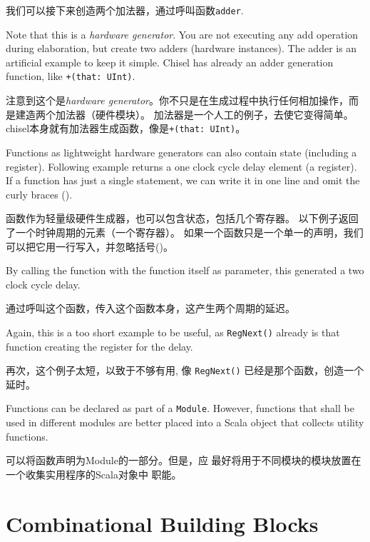 \documentclass[%
    10pt,
    headinclude, footexclude,
    openright, %
    notitlepage,
    cleardoubleempty,
    headsepline,
    pointlessnumbers,
    bibtotoc, idxtotoc,
    ]{scrbook}
\newcommand{\code}[1]{{\small{\texttt{#1}}}}
\begin{document}
\noindent 我们可以接下来创造两个加法器，通过呼叫函数\code{adder}.


\noindent Note that this is a \emph{hardware generator}. You are not executing any add operation
during elaboration, but create two adders (hardware instances). The adder is an artificial example
to keep it simple. Chisel has already an adder generation function, like \code{+(that: UInt)}.

\noindent 注意到这个是\emph{hardware generator}。你不只是在生成过程中执行任何相加操作，而是建造两个加法器（硬件模块）。
加法器是一个人工的例子，去使它变得简单。chisel本身就有加法器生成函数，像是\code{+(that: UInt)}。

Functions as lightweight hardware generators can also contain state (including a register).
Following example returns a one clock cycle delay element (a register).
If a function has just a single statement, we can write it in one line and omit the curly
braces ({}).

函数作为轻量级硬件生成器，也可以包含状态，包括几个寄存器。
以下例子返回了一个时钟周期的元素（一个寄存器）。
如果一个函数只是一个单一的声明，我们可以把它用一行写入，并忽略括号({})。


\noindent By calling the function with the function itself as parameter, this generated a two
clock cycle delay.

\noindent 通过呼叫这个函数，传入这个函数本身，这产生两个周期的延迟。


\noindent Again, this is a too short example to be useful, as \code{RegNext()}
already is that function creating the register for the delay.

\noindent 再次，这个例子太短，以致于不够有用, 像 \code{RegNext()}
已经是那个函数，创造一个延时。

Functions can be declared as part of a \code{Module}. However, functions that shall be
used in different modules are better placed into a Scala object that collects utility
functions.

可以将函数声明为Module的一部分。但是，应
最好将用于不同模块的模块放置在一个收集实用程序的Scala对象中
职能。

\chapter{Combinational Building Blocks}
\end{document}
